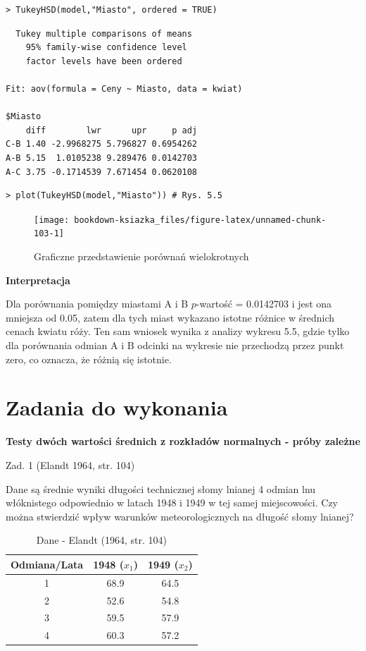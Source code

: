 \documentclass[12pt,B5paper,]{book}
\begin{document}
\begin{verbatim}
> TukeyHSD(model,"Miasto", ordered = TRUE)  
\end{verbatim}

\begin{verbatim}
  Tukey multiple comparisons of means
    95% family-wise confidence level
    factor levels have been ordered

Fit: aov(formula = Ceny ~ Miasto, data = kwiat)

$Miasto
    diff        lwr      upr     p adj
C-B 1.40 -2.9968275 5.796827 0.6954262
A-B 5.15  1.0105238 9.289476 0.0142703
A-C 3.75 -0.1714539 7.671454 0.0620108
\end{verbatim}

\begin{verbatim}
> plot(TukeyHSD(model,"Miasto")) # Rys. 5.5
\end{verbatim}

\begin{figure}[H]

{\centering \texttt{[image: bookdown-ksiazka\_files/figure-latex/unnamed-chunk-103-1]} 

}

\caption{Graficzne przedstawienie porównań wielokrotnych}\label{fig:unnamed-chunk-103}
\end{figure}

\textbf{Interpretacja}

Dla porównania pomiędzy miastami A i B \(p\)-wartość = 0.0142703 i jest
ona mniejsza od 0.05, zatem dla tych miast wykazano istotne różnice w
średnich cenach kwiatu róży. Ten sam wniosek wynika z analizy wykresu
5.5, gdzie tylko dla porównania odmian A i B odcinki na wykresie nie
przechodzą przez punkt zero, co oznacza, że różnią się istotnie.

\section{Zadania do wykonania}\label{zadania-do-wykonania-4}

\textbf{Testy dwóch wartości średnich z rozkładów normalnych - próby
zależne}

Zad. 1 (Elandt 1964, str. 104)

Dane są średnie wyniki długości technicznej słomy lnianej 4 odmian lnu
włóknistego odpowiednio w latach 1948 i 1949 w tej samej miejscowości.
Czy można stwierdzić wpływ warunków meteorologicznych na długość słomy
lnianej?

\begin{table}[H]
\centering
\caption{Dane - Elandt (1964, str. 104)}
\label{elandt104}
\begin{tabular}{ccc}
\hline
Odmiana/Lata & 1948 ($x_1$) & 1949 ($x_2$) \\ \hline
1            & 68.9      & 64.5      \\
2            & 52.6      & 54.8      \\
3            & 59.5      & 57.9      \\
4            & 60.3      & 57.2      \\ \hline
\end{tabular}
\end{table}
\end{document}
